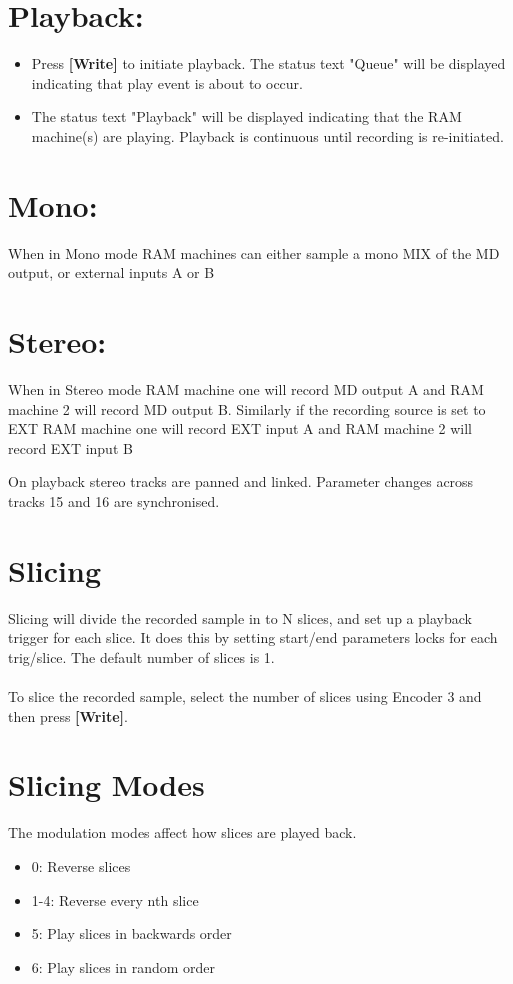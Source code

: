 \section{Playback:}
\begin{itemize}
\item Press \textbf{[Write]} to initiate playback. The status text "Queue" will be displayed indicating that play event is about to occur. 
\item The status text "Playback" will be displayed indicating that the RAM machine(s) are playing. Playback is continuous until recording is re-initiated. 
\end{itemize}


\section{Mono:}
When in Mono mode RAM machines can either sample a mono MIX of the MD output, or external inputs A or B
\section{Stereo:}
When in Stereo mode RAM machine one will record MD output A and RAM machine 2 will record MD output B. Similarly if the recording source is set to EXT RAM machine one will record EXT input A and RAM machine 2 will record EXT input B

On playback stereo tracks are panned and linked. Parameter changes across tracks 15 and 16 are synchronised.
\newpage
\section{Slicing}
Slicing will divide the recorded sample in to N slices, and set up a playback trigger for each slice. It does this by setting start/end parameters locks for each trig/slice. The default number of slices is 1.\\
\\
To slice the recorded sample, select the number of slices using Encoder 3 and then press \textbf{[Write]}.
\\

\section{Slicing Modes}

The modulation modes affect how slices are played back.
\begin{itemize}
    \item 0: Reverse slices
    \item 1-4: Reverse every nth slice
    \item 5: Play slices in backwards order
    \item 6: Play slices in random order
\end{itemize}



